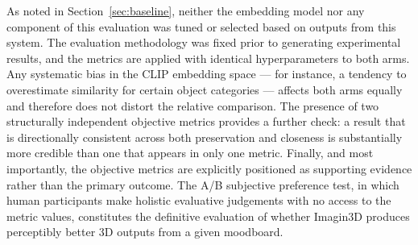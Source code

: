 As noted in Section~\ref{sec:baseline}, neither the embedding model nor any component of this evaluation was tuned or selected based on outputs from this system. The evaluation methodology was fixed prior to generating experimental results, and the metrics are applied with identical hyperparameters to both arms. Any systematic bias in the CLIP embedding space --- for instance, a tendency to overestimate similarity for certain object categories --- affects both arms equally and therefore does not distort the relative comparison. The presence of two structurally independent objective metrics provides a further check: a result that is directionally consistent across both preservation and closeness is substantially more credible than one that appears in only one metric. Finally, and most importantly, the objective metrics are explicitly positioned as supporting evidence rather than the primary outcome. The A/B subjective preference test, in which human participants make holistic evaluative judgements with no access to the metric values, constitutes the definitive evaluation of whether Imagin3D produces perceptibly better 3D outputs from a given moodboard.
